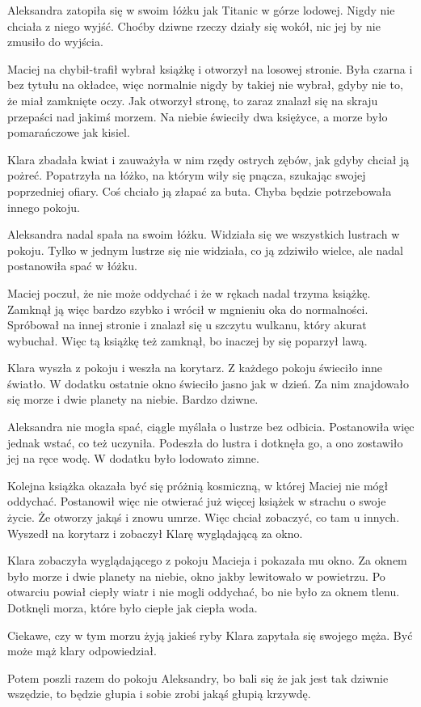Aleksandra zatopiła się w swoim łóżku jak Titanic w górze lodowej.
Nigdy nie chciała z niego wyjść.
Choćby dziwne rzeczy działy się wokół, nic jej by nie zmusiło do wyjścia.

Maciej na chybił-trafił wybrał książkę i otworzył na losowej stronie.
Była czarna i bez tytułu na okładce, więc normalnie nigdy by takiej nie wybrał, gdyby nie to, że miał zamknięte oczy.
Jak otworzył stronę, to zaraz znalazł się na skraju przepaści nad jakimś morzem.
Na niebie świeciły dwa księżyce, a morze było pomarańczowe jak kisiel.

Klara zbadała kwiat i zauważyła w nim rzędy ostrych zębów, jak gdyby chciał ją pożreć.
Popatrzyła na łóżko, na którym wiły się pnącza, szukając swojej poprzedniej ofiary.
Coś chciało ją złapać za buta.
Chyba będzie potrzebowała innego pokoju.

Aleksandra nadal spała na swoim łóżku.
Widziała się we wszystkich lustrach w pokoju.
Tylko w jednym lustrze się nie widziała, co ją zdziwiło wielce, ale nadal postanowiła spać w łóżku.

Maciej poczuł, że nie może oddychać i że w rękach nadal trzyma książkę.
Zamknął ją więc bardzo szybko i wrócił w mgnieniu oka do normalności.
Spróbował na innej stronie i znalazł się u szczytu wulkanu, który akurat wybuchał.
Więc tą książkę też zamknął, bo inaczej by się poparzył lawą.

Klara wyszła z pokoju i weszła na korytarz.
Z każdego pokoju świeciło inne światło.
W dodatku ostatnie okno świeciło jasno jak w dzień. Za nim znajdowało się morze i dwie planety na niebie.
Bardzo dziwne.

Aleksandra nie mogła spać, ciągle myślała o lustrze bez odbicia.
Postanowiła więc jednak wstać, co też uczyniła.
Podeszła do lustra i dotknęła go, a ono zostawiło jej na ręce wodę.
W dodatku było lodowato zimne.

Kolejna książka okazała być się próżnią kosmiczną, w której Maciej nie mógł oddychać.
Postanowił więc nie otwierać już więcej książek w strachu o swoje życie.
Że otworzy jakąś i znowu umrze.
Więc chciał zobaczyć, co tam u innych.
Wyszedł na korytarz i zobaczył Klarę wyglądającą za okno.

Klara zobaczyła wyglądającego z pokoju Macieja i pokazała mu okno.
Za oknem było morze i dwie planety na niebie, okno jakby lewitowało w powietrzu.
Po otwarciu powiał ciepły wiatr i nie mogli oddychać, bo nie było za oknem tlenu.
Dotknęli morza, które było ciepłe jak ciepła woda.
\begin{dialogue}
	\ds{} Ciekawe, czy w tym morzu żyją jakieś ryby \dm{} Klara zapytała się swojego męża.
	\ds{} Być może \dm{} mąż klary odpowiedział.
\end{dialogue}
Potem poszli razem do pokoju Aleksandry, bo bali się że jak jest tak dziwnie wszędzie, to będzie głupia i sobie zrobi jakąś głupią krzywdę.

